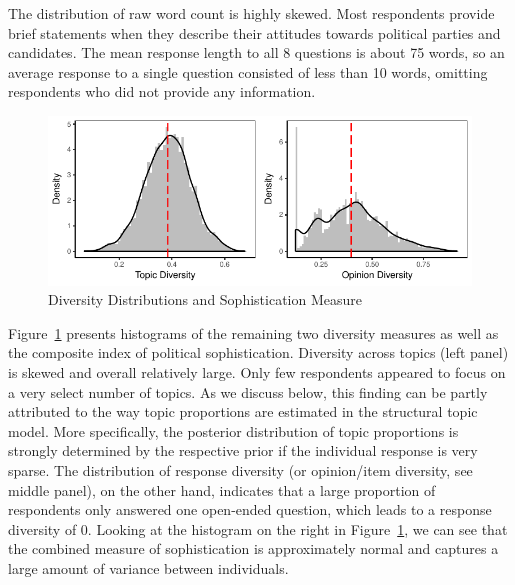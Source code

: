 \documentclass[12pt]{article}
\begin{document}
The distribution of raw word count is highly skewed. Most respondents provide brief statements when they describe their attitudes towards political parties and candidates. The mean response length to all 8 questions is about 75 words, so an average response to a single question consisted of less than 10 words, omitting respondents who did not provide any information.
\begin{figure}[h]
\includegraphics{../fig/diversity.pdf}
\caption{Diversity Distributions and Sophistication Measure}\label{fig:diversity}
\end{figure}

Figure~\ref{fig:diversity} presents histograms of the remaining two diversity measures as well as the composite index of political sophistication. Diversity across topics (left panel) is skewed and overall relatively large. Only few respondents appeared to focus on a very select number of topics. As we discuss below, this finding can be partly attributed to the way topic proportions are estimated in the structural topic model. More specifically, the posterior distribution of topic proportions is strongly determined by the respective prior if the individual response is very sparse. The distribution of response diversity (or opinion/item diversity, see middle panel), on the other hand, indicates that a large proportion of respondents only answered one open-ended question, which leads to a response diversity of 0. Looking at the histogram on the right in Figure~\ref{fig:diversity}, we can see that the combined measure of sophistication is approximately normal and captures a large amount of variance between individuals.
\end{document}
